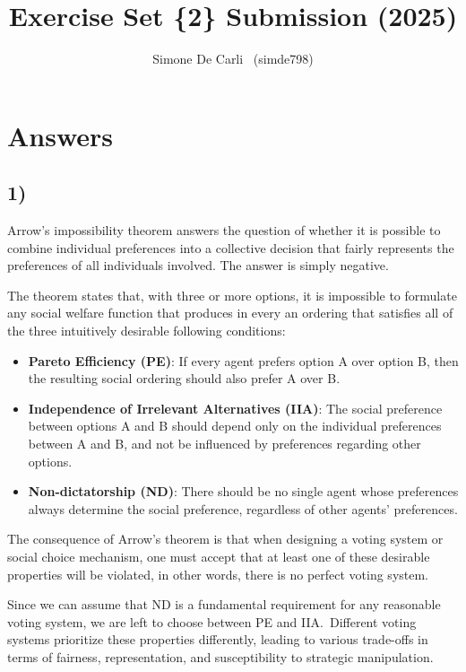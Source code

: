 \documentclass[10pt]{article}
\title{Exercise Set \{2\} Submission (2025)}
\author{Simone De Carli \, (simde798)}
\begin{document}
\maketitle

\section*{Answers}

\subsection*{1)}

Arrow's impossibility theorem answers the question of whether it is
possible to combine individual preferences into a collective decision
that fairly represents the preferences of all individuals involved.
The answer is simply negative.

The theorem states that, with three or more options, it is impossible
to formulate any social welfare function that produces in every an
ordering that satisfies all of the three intuitively desirable
following conditions:

\begin{itemize}
\item \textbf{Pareto Efficiency (PE)}: If every agent prefers option
  A over option B, then the resulting social ordering should also
  prefer A over B.
\item \textbf{Independence of Irrelevant Alternatives (IIA)}: The
  social preference between options A and B should depend only on the
  individual preferences between A and B, and not be influenced by
  preferences regarding other options.
\item \textbf{Non-dictatorship (ND)}: There should be no single agent
  whose preferences always determine the social preference,
  regardless of other agents' preferences.
\end{itemize}

The consequence of Arrow's theorem is that when designing a voting
system or social choice mechanism, one must accept that at least one
of these desirable properties will be violated, in other words, there
is no perfect voting system.

Since we can assume that ND is a fundamental requirement for any
reasonable voting system, we are left to choose between PE and
IIA.\ Different voting systems prioritize these properties
differently, leading to various trade-offs in terms of fairness,
representation, and susceptibility to strategic manipulation.
\end{document}
